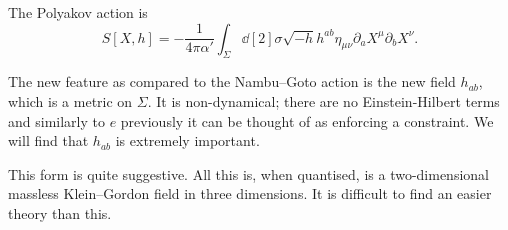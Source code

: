 \begin{definition}
  The Polyakov action is
  \begin{equation}
    S[X, h] = -\frac{1}{4 \pi \alpha'} \int_{\Sigma} \dd[2]{\sigma} \sqrt{-h} h^{ab} \eta_{\mu\nu} \partial_{a} X^{\mu} \partial_{b} X^{\nu}.
  \end{equation}
\end{definition}

The new feature as compared to the Nambu--Goto action is the new field $h_{ab}$, which is a metric on $\Sigma$.
It is non-dynamical; there are no Einstein-Hilbert terms and similarly to $e$ previously it can be thought of as enforcing a constraint.
We will find that $h_{ab}$ is extremely important.
\begin{leftbar}
  This form is quite suggestive. All this is, when quantised, is a two-dimensional massless Klein--Gordon field in three dimensions. It is difficult to find an easier theory than this.
\end{leftbar}
